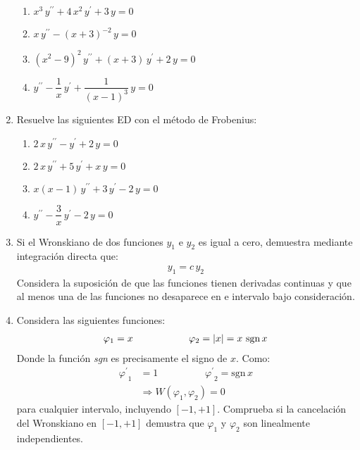 \documentclass[hidelinks,12pt]{article}
\newcommand{\pderivada}[1]{\ensuremath{{#1}^{\prime}}}
\newcommand{\sderivada}[1]{\ensuremath{{#1}^{\prime \prime}}}
\begin{document}
\begin{enumerate}
\begin{enumerate}[label=\roman*)]
\item $x^{3} \, \sderivada{y} + 4 \, x^{2} \, \pderivada{y} + 3 \, y = 0$
\item $x \, \sderivada{y} - (x + 3)^{-2} \, y = 0$
\item $(x^{2} - 9)^{2} \, \sderivada{y} + (x + 3) \, \pderivada{y} + 2 \, y = 0$
\item $\sderivada{y} - \dfrac{1}{x} \, \pderivada{y} + \dfrac{1}{(x - 1)^{3}} \, y = 0$
\end{enumerate}
\item Resuelve las siguientes ED con el método de Frobenius:
\begin{enumerate}[label=\Roman*)]
\item $2 \, x \, \sderivada{y} - \pderivada{y} + 2 \, y = 0$
\item $2 \, x \, \sderivada{y} + 5 \, \pderivada{y} + x \, y = 0$
\item $x (x - 1) \, \sderivada{y} + 3 \, \pderivada{y} - 2 \, y = 0$
\item $\sderivada{y} - \dfrac{3}{x} \, \pderivada{y} - 2 \, y = 0$
\end{enumerate}
\item Si el Wronskiano de dos funciones $y_{1}$ e $y_{2}$ es igual a cero, demuestra mediante integración directa que:
\begin{align*}
y_{1} = c \, y_{2}
\end{align*}
Considera la suposición de que las funciones tienen derivadas continuas y que al menos una de las funciones no desaparece en e intervalo bajo consideración.
\item Considera las siguientes funciones:
\begin{align*}
\varphi_{1} =  x \hspace{2cm} \varphi_{2} = \abs{x} = x \, \, \mbox{sgn} \, x
\end{align*}
Donde la función \textit{sgn} es precisamente el signo de $x$. Como:
\begin{align*}
\pderivada{\varphi}_{1} &=  1 \hspace{2cm} \pderivada{\varphi}_{2} = \mbox{sgn} \, x \\
&\Rightarrow W(\varphi_{1}, \varphi_{2}) = 0
\end{align*}
para cualquier intervalo, incluyendo $[-1, +1]$. Comprueba si la cancelación del Wronskiano en $[-1, +1]$ demustra que $\varphi_{1}$ y $\varphi_{2}$ son linealmente independientes.
\par

\end{enumerate}
\end{document}
